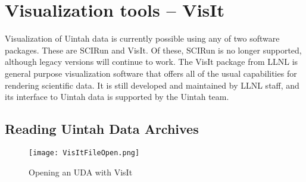 





\chapter{Visualization tools -- VisIt}

Visualization of Uintah data is currently possible using any of two
software packages.  These are SCIRun and VisIt.  Of these, SCIRun is
no longer supported, although legacy versions will continue to work.
The VisIt package from LLNL is general purpose visualization software
that offers all of the usual capabilities for rendering scientific
data.  It is still developed and maintained by LLNL staff, and its
interface to Uintah data is supported by the Uintah team. 



\section{Reading Uintah Data Archives}

\begin{wrapfigure}{r}{.50\textwidth}
  \vspace{-30pt}
  \begin{center}
    \texttt{[image: VisItFileOpen.png]}
  \end{center}
  \vspace{-20pt}
  \caption{Opening an UDA with VisIt}
  \vspace{-10pt}
  \label{VisItFileOpen}
\end{wrapfigure}


